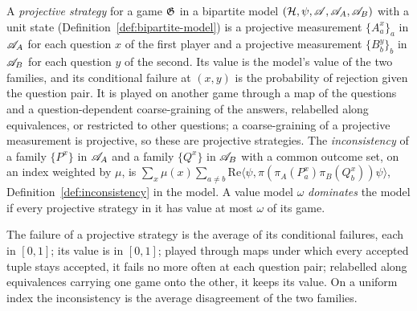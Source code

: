 \begin{definition}
\label{def:model-proj-strategy}
\leanok
A \emph{projective strategy} for a game $\mathfrak{G}$ in a bipartite model $(\mathcal{H}, \psi, \mathscr{A},
\mathscr{A}_A, \mathscr{A}_B)$ with a unit state (Definition~\ref{def:bipartite-model}) is a projective
measurement $\{A^x_a\}_a$ in $\mathscr{A}_A$ for each question $x$ of the first player and a projective
measurement $\{B^y_b\}_b$ in $\mathscr{A}_B$ for each question $y$ of the second. Its value is the model's
value of the two families, and its conditional failure at $(x, y)$ is the probability of rejection
given the question pair. It is played on another game through a map of the questions and a
question-dependent coarse-graining of the answers, relabelled along equivalences, or restricted to
other questions; a coarse-graining of a projective measurement is projective, so these are
projective strategies. The \emph{inconsistency} of a family $\{P^x\}$ in $\mathscr{A}_A$ and a family
$\{Q^x\}$ in $\mathscr{A}_B$ with a common outcome set, on an index weighted by $\mu$, is
$\sum_x \mu(x) \sum_{a \neq b} \mathrm{Re}\langle \psi, \pi(\pi_A(P^x_a)\pi_B(Q^x_b))\psi\rangle$,
Definition~\ref{def:inconsistency} in the model. A value model $\omega$ \emph{dominates} the model
if every projective strategy in it has value at most $\omega$ of its game.
\end{definition}

\begin{lemma}
\label{lem:model-proj-strategy}
\leanok
The failure of a projective
strategy is the average of its conditional failures, each in $[0, 1]$; its value is in $[0, 1]$;
played through maps under which every accepted tuple stays accepted, it fails no more often at
each question pair; relabelled along equivalences carrying one game onto the other, it keeps its
value. On a uniform index the inconsistency is the average disagreement of the two families.
\end{lemma}

